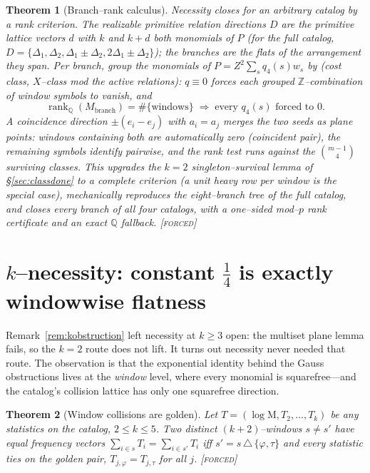 \documentclass[11pt]{article}
\newtheorem{theorem}{Theorem}[section]
\theoremstyle{definition}
\newcommand{\ph}{\varphi}
\newcommand{\Q}{\mathbb{Q}}
\newcommand{\Z}{\mathbb{Z}}
\newcommand{\Mah}{\mathrm{M}}
\newcommand{\forcedtag}{{\scshape [forced]}}
\begin{document}
\begin{theorem}[Branch--rank calculus]\label{thm:branchrank}
Necessity closes for an arbitrary catalog by a rank criterion. The realizable primitive relation
directions $D$ are the primitive lattice vectors $d$ with $k$ and $k+d$ both monomials of $P$ (for
the full catalog, $D=\{\Delta_1,\Delta_2,\Delta_1\pm\Delta_2,2\Delta_1\pm\Delta_2\}$); the
branches are the flats of the arrangement they span. Per branch, group the monomials of
$P=Z^2\sum_sq_4(s)w_s$ by (cost class, $X$--class mod the active relations): $q\equiv0$ forces each
grouped $\Z$--combination of window symbols to vanish, and
\[
\operatorname{rank}_{\Q}(M_{\mathrm{branch}})=\#\{\text{windows}\}\;\Longrightarrow\;
\text{every }q_4(s)\text{ forced to }0 .
\]
A coincidence direction $\pm(e_i-e_j)$ with $a_i=a_j$ merges the two seeds as plane points: windows
containing both are automatically zero (coincident pair), the remaining symbols identify pairwise,
and the rank test runs against the $\binom{m-1}{4}$ surviving classes. This upgrades the $k=2$
singleton--survival lemma of \S\ref{sec:classdone} to a complete criterion (a unit heavy row per
window is the special case), mechanically reproduces the eight--branch tree of the full catalog, and
closes every branch of all four catalogs, with a one--sided mod--$p$ rank certificate and an exact
$\Q$ fallback. \forcedtag
\end{theorem}

\section{$k$--necessity: constant $\tfrac14$ is exactly windowwise flatness}\label{sec:knec}

Remark~\ref{rem:kobstruction} left necessity at $k\ge3$ open: the multiset plane lemma fails, so
the $k=2$ route does not lift. It turns out necessity never needed that route. The observation is
that the exponential identity behind the Gauss obstructions lives at the \emph{window} level,
where every monomial is squarefree---and the catalog's collision lattice has only one squarefree
direction.

\begin{theorem}[Window collisions are golden]\label{thm:goldencollide}
Let $T=(\log\Mah,T_2,\dots,T_k)$ be any statistics on the catalog, $2\le k\le5$. Two distinct
$(k{+}2)$--windows $s\ne s'$ have equal frequency vectors $\sum_{i\in s}T_i=\sum_{i\in s'}T_i$ iff
$s'=s\,\triangle\,\{\ph,\tau\}$ and \emph{every} statistic ties on the golden pair,
$T_{j,\ph}=T_{j,\tau}$ for all $j$. \forcedtag
\end{theorem}
\end{document}
